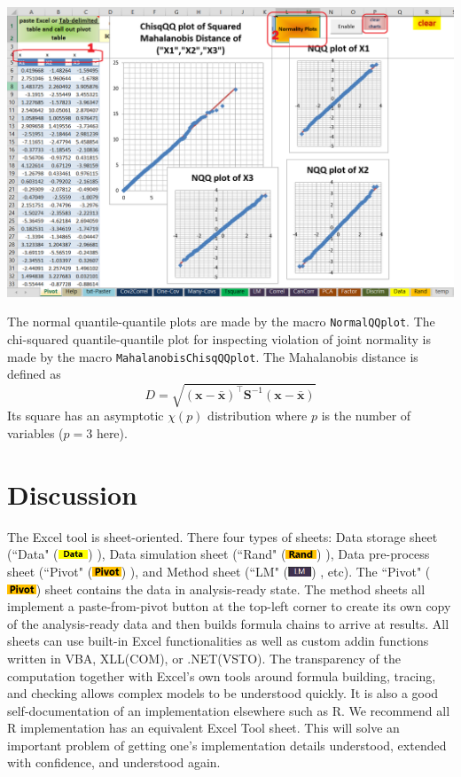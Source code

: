 \documentclass[article]{jss}
\newcommand{\shtData}{``Data" (\includegraphics[height=8pt, keepaspectratio=true]{DataSheetTab_png}) }
\newcommand{\shtRand}{``Rand" (\includegraphics[height=8pt, keepaspectratio=true]{RandSheetTab_png}) }
\newcommand{\shtPivot}{``Pivot" (\includegraphics[height=8pt, keepaspectratio=true]{PivotSheetTab_png}) }
\newcommand{\shtLM}{``LM" (\includegraphics[height=8pt, keepaspectratio=true]{LMSheetTab_png}) }
\begin{document}
\begin{enumerate}
        \begin{center}
	        \includegraphics[width=\linewidth, keepaspectratio=true]{PivotSheetNormalityPlots_png}
        \end{center}
        The normal quantile-quantile plots are made by the  macro \texttt{NormalQQplot}. The chi-squared quantile-quantile plot for inspecting violation of joint normality is made by the macro \texttt{MahalanobisChisqQQplot}. The Mahalanobis distance is defined as \[D = \sqrt {{{\left( {\textbf{x} - \bar{\textbf{x}}} \right)}^ \intercal }{\textbf{S}^{ - 1}}\left( {\textbf{x} - \bar{\textbf{x}}} \right)} \]
        Its square has an asymptotic $\chi(p)$ distribution where $p$ is the number of variables ($p=3$ here).
        \end{enumerate}
        
        
        
        \section[software]{Discussion}
        The Excel tool is sheet-oriented. There four types of sheets: Data storage sheet (\shtData), Data simulation sheet (\shtRand), Data pre-process sheet (\shtPivot), and Method sheet (\shtLM, etc). The \shtPivot sheet contains the data in analysis-ready state. The method sheets all implement a paste-from-pivot button at the top-left corner to create its own copy of the analysis-ready data and then builds formula chains to arrive at results. All sheets can use built-in Excel functionalities as well as custom addin functions written in VBA, XLL(COM), or .NET(VSTO). The transparency of the computation together with Excel's own tools around formula building, tracing, and checking allows complex models to be understood quickly. It is also a good self-documentation of an implementation elsewhere such as R. We recommend all R implementation has an equivalent Excel Tool sheet. This will solve an important problem of getting one's implementation details understood, extended with confidence, and understood again.
        
        
        
\end{document}
